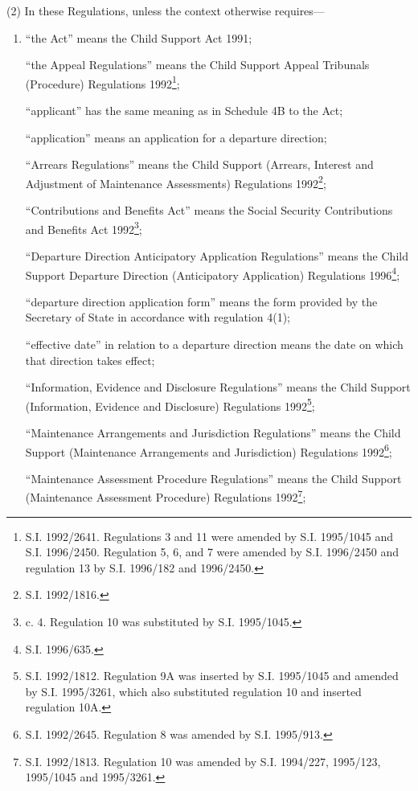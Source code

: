 \documentclass[a4paper]{article}
\begin{document}
(2) In these Regulations, unless the context otherwise requires—
\begin{enumerate}\item[]
“the Act” means the Child Support Act 1991;

“the Appeal Regulations” means the Child Support Appeal Tribunals (Procedure)
Regulations 1992\footnote{\frenchspacing S.I. 1992/2641. Regulations 3 and 11 were amended by S.I. 1995/1045 and S.I. 1996/2450. Regulation 5, 6, and 7 were amended by S.I. 1996/2450 and regulation 13 by S.I. 1996/182 and 1996/2450.};

“applicant” has the same meaning as in Schedule 4B to the Act;

“application” means an application for a departure direction;

“Arrears Regulations” means the Child Support (Arrears, Interest and Adjustment
of Maintenance Assessments) Regulations 1992\footnote{\frenchspacing S.I. 1992/1816.};

“Contributions and Benefits Act” means the Social Security Contributions and
Benefits Act 1992\footnote{ c. 4. Regulation 10 was substituted by S.I. 1995/1045.};

“Departure Direction Anticipatory Application Regulations” means the Child
Support Departure Direction (Anticipatory Application) Regulations 1996\footnote{\frenchspacing S.I. 1996/635.};

“departure direction application form” means the form provided by the Secretary
of State in accordance with regulation 4(1);

“effective date” in relation to a departure direction means the date on which
that direction takes effect;

“Information, Evidence and Disclosure Regulations” means the Child Support
(Information, Evidence and Disclosure) Regulations 1992\footnote{\frenchspacing S.I. 1992/1812. Regulation 9A was inserted by S.I. 1995/1045 and amended by S.I. 1995/3261, which also substituted regulation 10 and inserted regulation 10A.};

“Maintenance Arrangements and Jurisdiction Regulations” means the Child Support
(Maintenance Arrangements and Jurisdiction) Regulations 1992\footnote{\frenchspacing S.I. 1992/2645. Regulation 8 was amended by S.I. 1995/913.};

“Maintenance Assessment Procedure Regulations” means the Child Support
(Maintenance Assessment Procedure) Regulations 1992\footnote{\frenchspacing S.I. 1992/1813. Regulation 10 was amended by S.I. 1994/227, 1995/123, 1995/1045 and 1995/3261.};


\end{enumerate}
\end{document}
